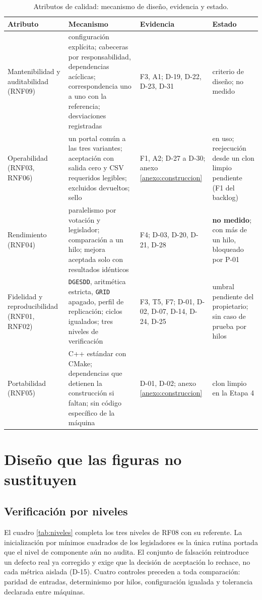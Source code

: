 \begin{table}[tbp]
\centering
\caption{Atributos de calidad: mecanismo de diseño, evidencia y estado.}
\label{tab:atributos}
\footnotesize
\begin{tabular}{L{2.7cm}L{4.2cm}L{2.4cm}L{3.0cm}}
\toprule
Atributo & Mecanismo & Evidencia & Estado \\
\midrule
Mantenibilidad y auditabilidad (RNF09) & configuración explícita; cabeceras por
responsabilidad, dependencias acíclicas; correspondencia uno a uno con la referencia;
desviaciones registradas & F3, A1; D-19, D-22, D-23, D-31 & criterio de diseño; no medido \\
\addlinespace
Operabilidad (RNF03, RNF06) & un portal común a las tres variantes; aceptación con salida cero
y CSV requeridos legibles; excluidos devueltos; sello & F1, A2; D-27
a D-30; anexo \ref{anexo:construccion} & en uso; reejecución desde un clon limpio pendiente
(F1 del backlog) \\
\addlinespace
Rendimiento (RNF04) & paralelismo por votación y legislador; comparación a un hilo; mejora
aceptada solo con resultados idénticos & F4; D-03, D-20, D-21, D-28 & \textbf{no medido}; con
más de un hilo, bloqueado por P-01 \\
\addlinespace
Fidelidad y reproducibilidad (RNF01, RNF02) & \texttt{DGESDD}, aritmética estricta,
\texttt{GRID} apagado, perfil de replicación; ciclos igualados; tres niveles de verificación &
F3, T5, F7; D-01, D-02, D-07, D-14, D-24, D-25 & umbral pendiente del propietario; sin caso de
prueba por hilos \\
\addlinespace
Portabilidad (RNF05) & C++ estándar con CMake; dependencias que detienen la construcción si
faltan; sin código específico de la máquina & D-01, D-02; anexo \ref{anexo:construccion} &
clon limpio en la Etapa 4 \\
\bottomrule
\end{tabular}
\end{table}

\section{Diseño que las figuras no sustituyen}
\label{sec:cuadros}

\subsection{Verificación por niveles}
\label{sec:niveles}

El cuadro \ref{tab:niveles} completa los tres niveles de RF08 con su referente. La
inicialización por mínimos cuadrados de los legisladores es la única rutina portada que el
nivel de componente aún no audita. El conjunto de falsación reintroduce un defecto real ya
corregido y exige que la decisión de aceptación lo rechace, no cada métrica aislada (D-15). Cuatro controles preceden a toda
comparación: paridad de entradas, determinismo por hilos, configuración igualada y tolerancia
declarada entre máquinas.

